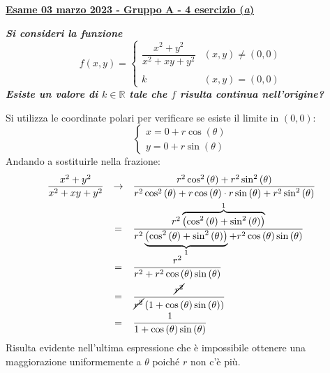 \documentclass[a4paper]{article}
\newcommand{\definition}[1]{\textcolor{Red3}{\textbf{#1}}}
\newcommand{\example}[1]{\textcolor{Green4}{\textbf{#1}}}
\begin{document}
	\begin{flushleft}
		\label{exam: esame 03 marzo 2023 - Gruppo A - 4 esercizio (a)}
		\hypertarget{
			exam: esame 03 marzo 2023 - Gruppo A - 4 esercizio (a)
		}{
			\definition{\underline{Esame 03 marzo 2023 - Gruppo A - 4 esercizio (\emph{a})}}
		}
	\end{flushleft}
	\example{\emph{Si consideri la funzione}
	\begin{equation*}
		f\left(x,y\right) = \begin{cases}
			\dfrac{x^{2}+y^{2}}{x^{2}+xy+y^{2}} & \left(x,y\right) \ne \left(0,0\right) \\
			\\
			k & \left(x,y\right) = \left(0,0\right)
		\end{cases}
	\end{equation*}
	\emph{Esiste un valore di $k \in \mathbb{R}$ tale che $f$ risulta continua nell'origine?}}\newline

	\noindent
	Si utilizza le coordinate polari per verificare se esiste il limite in $\left(0,0\right)$:
	\begin{equation*}
		\begin{cases}
			x=0+r\cos\left(\theta\right) \\
			y=0+r\sin\left(\theta\right)
		\end{cases}
	\end{equation*}
	Andando a sostituirle nella frazione:
	\begin{equation*}
		\begin{array}{rcl}
			\dfrac{x^{2}+y^{2}}{x^{2}+xy+y^{2}} 
			&\rightarrow& 
			\dfrac{
				r^{2}\cos^{2}\left(\theta\right)+r^{2}\sin^{2}\left(\theta\right)
			}{
				r^{2}\cos^{2}\left(\theta\right) + r\cos\left(\theta\right) \cdot r\sin\left(\theta\right) + r^{2}\sin^{2}\left(\theta\right)
			} \\ [1em]
			&=&
			\dfrac{r^{2}\overbrace{\left(\cos^{2}\left(\theta\right)+\sin^{2}\left(\theta\right)\right)}^{1}}{r^{2}\underbrace{\left(\cos^{2}\left(\theta\right)+\sin^{2}\left(\theta\right)\right)}_{1} + r^{2} \cos\left(\theta\right)\sin\left(\theta\right)} \\ [1em]
			&=& \dfrac{r^{2}}{r^{2} + r^{2}\cos\left(\theta\right)\sin\left(\theta\right)} \\ [1em]
			&=& \dfrac{\cancel{r^{2}}}{\cancel{r^{2}} \left(1 + \cos\left(\theta\right)\sin\left(\theta\right)\right)} \\ [1em]
			&=& \dfrac{1}{1 + \cos\left(\theta\right)\sin\left(\theta\right)}
		\end{array}
	\end{equation*}
	Risulta evidente nell'ultima espressione che è impossibile ottenere una maggiorazione uniformemente a $\theta$ poiché $r$ non c'è più.
\end{document}
